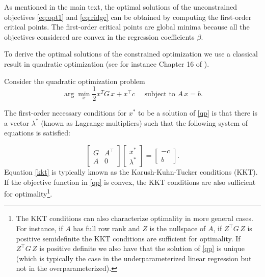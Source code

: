 \documentclass[12pt,letterpaper]{article}
\begin{document}
As mentioned in the main text, the optimal solutions of the unconstrained objectives \eqref{eq:opt1} and \eqref{eq:ridge} can be obtained by computing the first-order critical points. The first-order critical points are global minima because all the objectives considered are convex in the regression coefficients $\beta$.

To derive the optimal solutions of the constrained optimization we use a classical result in quadratic optimization (see for instance Chapter 16 of \cite{nocedal2006numerical}).

Consider the quadratic optimization problem 
\begin{equation} \label{qp}
    \arg\min_x \frac{1}{2} x^T G\, x + x^\top c \quad \text{ subject to } A\,x=b.
\end{equation}

The first-order necessary conditions for $x^*$ to be a solution of \eqref{qp} is that there is a vector $\lambda^*$ (known as Lagrange multipliers) such that the following system of equations is satisfied:

\begin{equation}
    \left[
    \begin{matrix}
    G & A^\top \\ 
    A & 0
    \end{matrix}\right]
    \left[
    \begin{matrix}
    x^* \\ 
    \lambda^*
    \end{matrix}\right] = 
    \left[
    \begin{matrix}
    -c \\ 
    b
    \end{matrix}\right].
    \label{kkt}
\end{equation}
Equation \eqref{kkt} is typically known as the Karush-Kuhn-Tucker conditions (KKT). If the objective function in \eqref{qp} is convex, the KKT conditions are also sufficient for optimality\footnote{The KKT conditions can also characterize optimality in more general cases. For instance, if $A$ has full row rank and $Z$ is the nullspace of $A$, if $Z^\top G\, Z$ is positive semidefinite the KKT conditions are sufficient for optimality. If $Z^\top G\, Z$ is positive definite we also have that the solution of \eqref{qp} is unique (which is typically the case in the underparameterized linear regression but not in the overparameterized).}.
\end{document}
